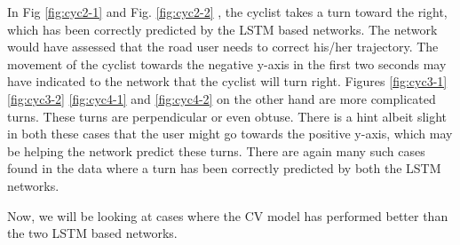 \documentclass{article}
\begin{document}
In Fig \ref{fig:cyc2-1} and Fig. \ref{fig:cyc2-2} , the cyclist takes a turn toward the right, which has been correctly predicted by the LSTM based networks. The network would have assessed that the road user needs to correct his/her trajectory.  The movement of the cyclist towards the negative y-axis in the first two seconds may have indicated to the network that the cyclist will turn right. Figures \ref{fig:cyc3-1} \ref{fig:cyc3-2} \ref{fig:cyc4-1} and \ref{fig:cyc4-2} on the other hand are more complicated turns. These turns are perpendicular or even obtuse. There is a hint albeit slight in both these cases that the user might go towards the positive y-axis, which may be helping the network predict these turns. There are again many such cases found in the data where a turn has been correctly predicted by both the LSTM networks. 

Now, we will be looking at cases where the CV model has performed better than the two LSTM based networks. 
\end{document}
